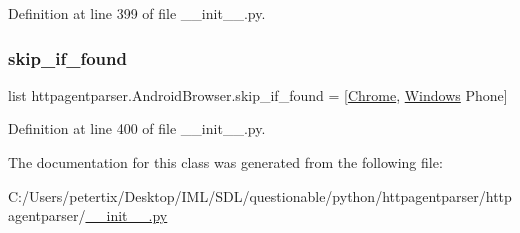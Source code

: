 Definition at line 399 of file \+\_\+\+\_\+init\+\_\+\+\_\+.\+py.

\hypertarget{classhttpagentparser_1_1_android_browser_ab4efff681835586292f1d846b169f07b}{}\label{classhttpagentparser_1_1_android_browser_ab4efff681835586292f1d846b169f07b} 
\subsubsection{\texorpdfstring{skip\+\_\+if\+\_\+found}{skip\_if\_found}}
{\footnotesize\ttfamily list httpagentparser.\+Android\+Browser.\+skip\+\_\+if\+\_\+found = \mbox{[}\textquotesingle{}\hyperlink{classhttpagentparser_1_1_chrome}{Chrome}\textquotesingle{}, \textquotesingle{}\hyperlink{classhttpagentparser_1_1_windows}{Windows} Phone\textquotesingle{}\mbox{]}\hspace{0.3cm}{\ttfamily [static]}}



Definition at line 400 of file \+\_\+\+\_\+init\+\_\+\+\_\+.\+py.



The documentation for this class was generated from the following file\+:\begin{DoxyCompactItemize}
\item 
C\+:/\+Users/petertix/\+Desktop/\+I\+M\+L/\+S\+D\+L/questionable/python/httpagentparser/httpagentparser/\hyperlink{____init_____8py}{\+\_\+\+\_\+init\+\_\+\+\_\+.\+py}\end{DoxyCompactItemize}
